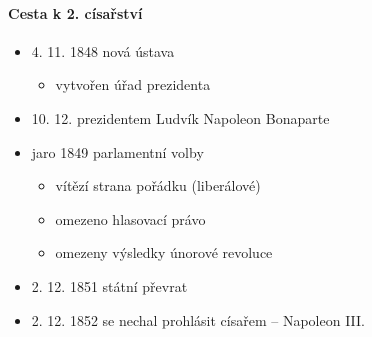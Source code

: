 \paragraph{Cesta k 2. císařství}
\begin{itemize}
\item 4. 11. 1848 nová ústava 
	\begin{itemize}
	\item vytvořen úřad prezidenta
	\end{itemize}
\item 10. 12. prezidentem Ludvík Napoleon Bonaparte
\item jaro 1849 parlamentní volby
	\begin{itemize}
	\item vítězí strana pořádku (liberálové)
	\item omezeno hlasovací právo
	\item omezeny výsledky únorové revoluce 
	\end{itemize}
\item 2. 12. 1851 státní převrat
\item 2. 12. 1852 se nechal prohlásit císařem -- Napoleon III.
\end{itemize}


